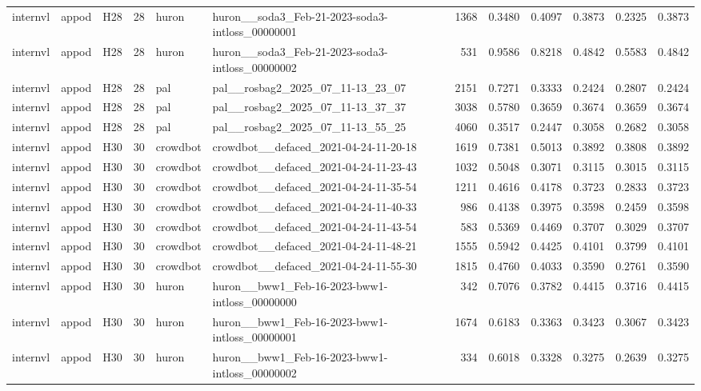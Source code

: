 \begin{table}[tbp]
\begin{tabular}{lllrllrrrrrr}
internvl & appod & H28 & 28 & huron & huron\_\_soda3\_Feb-21-2023-soda3-intloss\_00000001 & 1368 & 0.3480 & 0.4097 & 0.3873 & 0.2325 & 0.3873 \\
internvl & appod & H28 & 28 & huron & huron\_\_soda3\_Feb-21-2023-soda3-intloss\_00000002 & 531 & 0.9586 & 0.8218 & 0.4842 & 0.5583 & 0.4842 \\
internvl & appod & H28 & 28 & pal & pal\_\_rosbag2\_2025\_07\_11-13\_23\_07 & 2151 & 0.7271 & 0.3333 & 0.2424 & 0.2807 & 0.2424 \\
internvl & appod & H28 & 28 & pal & pal\_\_rosbag2\_2025\_07\_11-13\_37\_37 & 3038 & 0.5780 & 0.3659 & 0.3674 & 0.3659 & 0.3674 \\
internvl & appod & H28 & 28 & pal & pal\_\_rosbag2\_2025\_07\_11-13\_55\_25 & 4060 & 0.3517 & 0.2447 & 0.3058 & 0.2682 & 0.3058 \\
internvl & appod & H30 & 30 & crowdbot & crowdbot\_\_defaced\_2021-04-24-11-20-18 & 1619 & 0.7381 & 0.5013 & 0.3892 & 0.3808 & 0.3892 \\
internvl & appod & H30 & 30 & crowdbot & crowdbot\_\_defaced\_2021-04-24-11-23-43 & 1032 & 0.5048 & 0.3071 & 0.3115 & 0.3015 & 0.3115 \\
internvl & appod & H30 & 30 & crowdbot & crowdbot\_\_defaced\_2021-04-24-11-35-54 & 1211 & 0.4616 & 0.4178 & 0.3723 & 0.2833 & 0.3723 \\
internvl & appod & H30 & 30 & crowdbot & crowdbot\_\_defaced\_2021-04-24-11-40-33 & 986 & 0.4138 & 0.3975 & 0.3598 & 0.2459 & 0.3598 \\
internvl & appod & H30 & 30 & crowdbot & crowdbot\_\_defaced\_2021-04-24-11-43-54 & 583 & 0.5369 & 0.4469 & 0.3707 & 0.3029 & 0.3707 \\
internvl & appod & H30 & 30 & crowdbot & crowdbot\_\_defaced\_2021-04-24-11-48-21 & 1555 & 0.5942 & 0.4425 & 0.4101 & 0.3799 & 0.4101 \\
internvl & appod & H30 & 30 & crowdbot & crowdbot\_\_defaced\_2021-04-24-11-55-30 & 1815 & 0.4760 & 0.4033 & 0.3590 & 0.2761 & 0.3590 \\
internvl & appod & H30 & 30 & huron & huron\_\_bww1\_Feb-16-2023-bww1-intloss\_00000000 & 342 & 0.7076 & 0.3782 & 0.4415 & 0.3716 & 0.4415 \\
internvl & appod & H30 & 30 & huron & huron\_\_bww1\_Feb-16-2023-bww1-intloss\_00000001 & 1674 & 0.6183 & 0.3363 & 0.3423 & 0.3067 & 0.3423 \\
internvl & appod & H30 & 30 & huron & huron\_\_bww1\_Feb-16-2023-bww1-intloss\_00000002 & 334 & 0.6018 & 0.3328 & 0.3275 & 0.2639 & 0.3275 \\

\end{tabular}
\end{table}
